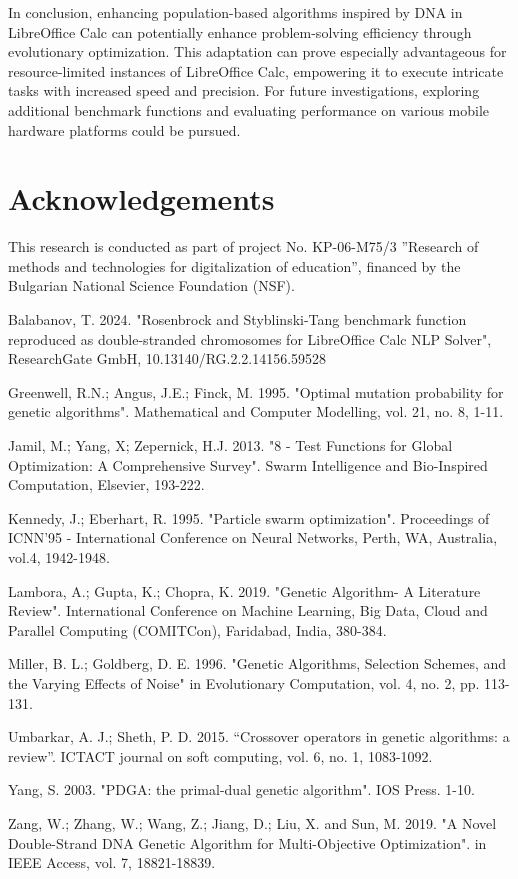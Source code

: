 \documentclass[runningheads]{llncs}
\begin{document}
In conclusion, enhancing population-based algorithms inspired by DNA in LibreOffice Calc can potentially enhance problem-solving efficiency through evolutionary optimization. This adaptation can prove especially advantageous for resource-limited instances of LibreOffice Calc, empowering it to execute intricate tasks with increased speed and precision. For future investigations, exploring additional benchmark functions and evaluating performance on various mobile hardware platforms could be pursued.

\section*{Acknowledgements} This research is conducted as part of project No. KP-06-M75/3 ''Research of methods and technologies for digitalization of education'', financed by the Bulgarian National Science Foundation (NSF).

\begin{thebibliography}{8}

 Balabanov, T. 2024. "Rosenbrock and Styblinski-Tang benchmark function reproduced as double-stranded chromosomes for LibreOffice Calc NLP Solver", ResearchGate GmbH, 10.13140/RG.2.2.14156.59528

 Greenwell, R.N.; Angus, J.E.; Finck, M. 1995. "Optimal mutation probability for genetic algorithms". Mathematical and Computer Modelling, vol. 21, no. 8, 1-11.

 Jamil, M.; Yang, X; Zepernick, H.J. 2013. "8 - Test Functions for Global Optimization: A Comprehensive Survey". Swarm Intelligence and Bio-Inspired Computation, Elsevier, 193-222.

 Kennedy, J.; Eberhart, R. 1995. "Particle swarm optimization". Proceedings of ICNN'95 - International Conference on Neural Networks, Perth, WA, Australia, vol.4, 1942-1948.

 Lambora, A.; Gupta, K.; Chopra, K. 2019. "Genetic Algorithm- A Literature Review". International Conference on Machine Learning, Big Data, Cloud and Parallel Computing (COMITCon), Faridabad, India, 380-384.

 Miller, B. L.; Goldberg, D. E. 1996. "Genetic Algorithms, Selection Schemes, and the Varying Effects of Noise" in Evolutionary Computation, vol. 4, no. 2, pp. 113-131.

 Umbarkar, A. J.; Sheth, P. D. 2015. “Crossover operators in genetic algorithms: a review”. ICTACT journal on soft computing, vol. 6, no. 1, 1083-1092.

 Yang, S. 2003. "PDGA: the primal-dual genetic algorithm". IOS Press. 1-10.

 Zang, W.; Zhang, W.; Wang, Z.; Jiang, D.; Liu, X. and Sun, M. 2019. "A Novel Double-Strand DNA Genetic Algorithm for Multi-Objective Optimization". in IEEE Access, vol. 7, 18821-18839.

\end{thebibliography}
\end{document}
